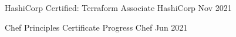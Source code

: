 \textcolor{awesome}{\raisebox{0.1\height}{\faCertificate\thinspace}}


\begin{cvhonors}

  \cvhonor
    {HashiCorp Certified: Terraform Associate} %
    {HashiCorp} %
    {} %
    {Nov 2021} %

  \cvhonor
    {Chef Principles Certificate} %
    {Progress Chef} %
    {} %
    {Jun 2021} %

\end{cvhonors}
